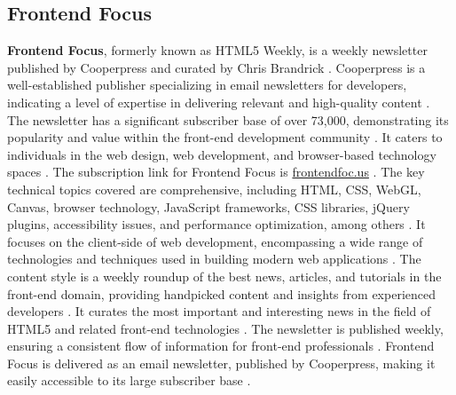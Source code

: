 \documentclass[11pt]{article}
\begin{document}
\subsection{Frontend Focus}
\textbf{Frontend Focus}, formerly known as HTML5 Weekly, is a weekly newsletter published by Cooperpress and curated by Chris Brandrick \citep{runcloud2025worlds}. Cooperpress is a well-established publisher specializing in email newsletters for developers, indicating a level of expertise in delivering relevant and high-quality content \citep{cooperpress2025pubs}. The newsletter has a significant subscriber base of over 73,000, demonstrating its popularity and value within the front-end development community \citep{runcloud2025worlds}. It caters to individuals in the web design, web development, and browser-based technology spaces \citep{github2025devnewsletters}. The subscription link for Frontend Focus is \url{frontendfoc.us} \citep{runcloud2025worlds}. The key technical topics covered are comprehensive, including HTML, CSS, WebGL, Canvas, browser technology, JavaScript frameworks, CSS libraries, jQuery plugins, accessibility issues, and performance optimization, among others \citep{runcloud2025worlds}. It focuses on the client-side of web development, encompassing a wide range of technologies and techniques used in building modern web applications \citep{brainhub2025nodejsnews}. The content style is a weekly roundup of the best news, articles, and tutorials in the front-end domain, providing handpicked content and insights from experienced developers \citep{runcloud2025worlds}. It curates the most important and interesting news in the field of HTML5 and related front-end technologies \citep{runcloud2025worlds}. The newsletter is published weekly, ensuring a consistent flow of information for front-end professionals \citep{runcloud2025worlds}. Frontend Focus is delivered as an email newsletter, published by Cooperpress, making it easily accessible to its large subscriber base \citep{frontendfocus2025}.
\end{document}
